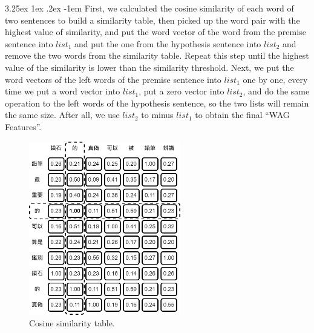 \documentclass[12pt]{article}
\makeatletter
\renewcommand\paragraph{\@startsection{paragraph}{5}{\z@}%
  {3.25ex \@plus1ex \@minus.2ex}%
  {-1em}%
  {\normalfont\normalsize\bfseries}}
\makeatother
\begin{document}
\begin{CJK*}{UTF8}{bkai}
\begin{spacing}{1.77}
\paragraph{}
First, we calculated the cosine similarity of each word of two sentences to build a similarity table, then picked up the word pair with the highest value of similarity, and put the word vector of the word from the premise sentence into $list_1$ and put the one from the hypothesis sentence into $list_2$ and remove the two words from the similarity table. Repeat this step until the highest value of the similarity is lower than the similarity threshold. Next, we put the word vectors of the left words of the premise sentence into $list_1$ one by one, every time we put a word vector into $list_1$, put a zero vector into $list_2$, and do the same operation to the left words of the hypothesis sentence, so the two lists will remain the same size. After all, we use $list_2$ to minus $list_1$ to obtain the final ``WAG Features''.

\begin{figure}[H]
  \centering
  \includegraphics[width=250px]{WAG.png}
  \caption[Cosine Similarity Table]{Cosine similarity table.}
  \label{fig:csa}
\end{figure}


\end{spacing}
\end{CJK*}
\end{document}
